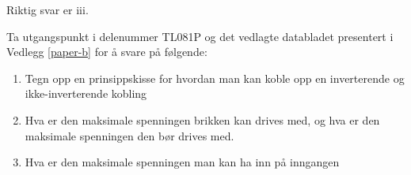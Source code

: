 \vspace{0.5cm} %

\begin{solution}[name=Løsningsforslag oppgave]
	Riktig svar er iii.

\end{solution}
\vspace{0.5cm} %


\begin{question}[name=Oppgave, topic=operasjonsforsterker]
Ta utgangspunkt i delenummer TL081P og det vedlagte databladet presentert i Vedlegg \ref{paper-b} for å svare på følgende:
	\begin{enumerate}[label=\roman*)]
	\item Tegn opp en prinsippskisse for hvordan man kan koble opp en inverterende og ikke-inverterende kobling
	\item Hva er den maksimale spenningen brikken kan drives med, og hva er den maksimale spenningen den bør drives med.
	\item Hva er den maksimale spenningen man kan ha inn på inngangen
	\end{enumerate}



\end{question}

\vspace{0.5cm} %

\begin{solution}[name=Løsningsforslag oppgave]


\end{solution}
\vspace{0.5cm} %


